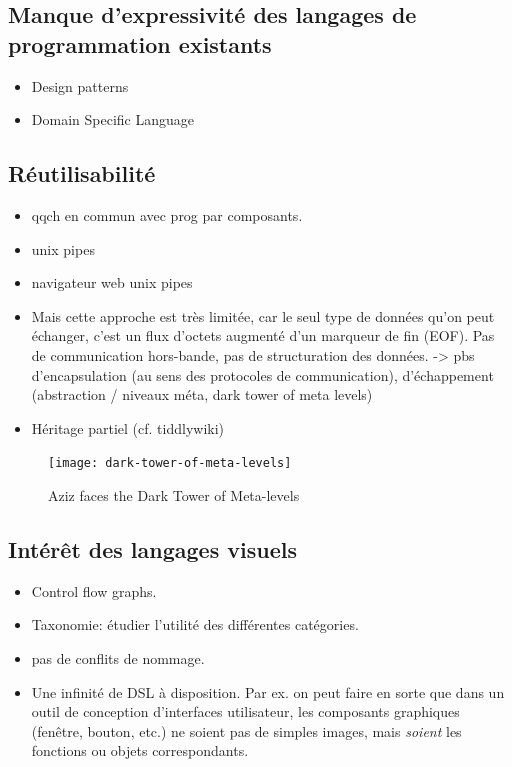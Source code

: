 \documentclass{article}
\begin{document}
\subsection[Manque d'expressivité]{Manque d'expressivité des langages de programmation existants}
\begin{itemize}
\item Design patterns
\item Domain Specific Language
\end{itemize}

\subsection{Réutilisabilité}

\begin{itemize}
\item qqch en commun avec prog par composants.
\item unix pipes
\item navigateur web unix pipes
\item Mais cette approche est très limitée, car le seul type de données qu'on peut échanger, c'est un flux d'octets augmenté d'un marqueur
  de fin (EOF). Pas de communication hors-bande, pas de structuration des données. -> pbs d'encapsulation (au sens des protocoles de
  communication), d'échappement (abstraction / niveaux méta, dark tower of meta levels)
\item Héritage partiel (cf. tiddlywiki)
\end{itemize}

\begin{figure}[htbp]
  \centering
  \texttt{[image: dark-tower-of-meta-levels]}
  \caption{Aziz faces the Dark Tower of Meta-levels}%
\label{fig:dark-tower-meta-levels}
\end{figure}

\subsection{Intérêt des langages visuels}
\begin{itemize}
\item Control flow graphs.
\item Taxonomie: étudier l'utilité des différentes catégories.
\item pas de conflits de nommage.
\item Une infinité de DSL à disposition. Par ex. on peut faire en sorte que dans un outil de conception d'interfaces utilisateur, les composants graphiques (fenêtre, bouton, etc.) ne soient pas de simples images, mais \emph{soient} les fonctions ou objets correspondants.
\end{itemize}
\end{document}
